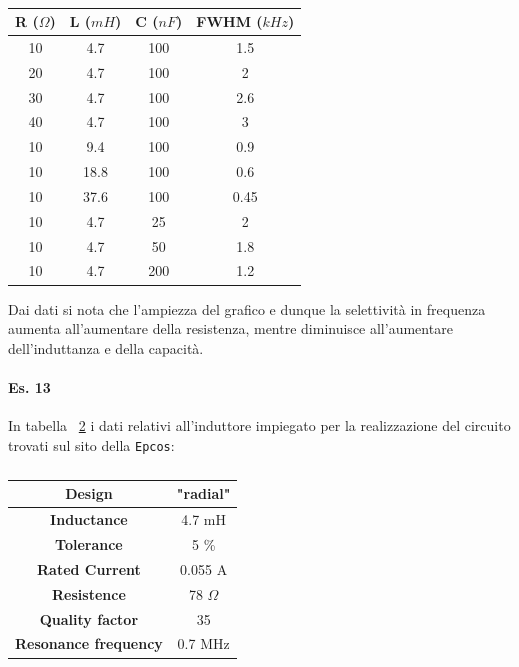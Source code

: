 \documentclass[journal, a4paper]{IEEEtran}
\begin{document}
\begin{table}[htp]
\caption{}
\label{tab:tab1}
\begin{tabular}{c|c|c|c}
\hline 
R ($\Omega$) & L ($mH$) & C ($nF$) & FWHM ($kHz$) \\ 
\hline 
10 & 4.7 & 100 & 1.5 \\ 
\hline 
20 & 4.7 & 100 & 2 \\ 
\hline 
30 & 4.7 & 100 & 2.6 \\ 
\hline 
40 & 4.7 & 100 & 3 \\ 
\hline 
10 & 9.4 & 100 & 0.9 \\ 
\hline 
10 & 18.8 & 100 & 0.6 \\ 
\hline 
10 & 37.6 & 100 & 0.45 \\ 
\hline 
10 & 4.7 & 25 & 2 \\ 
\hline 
10 & 4.7 & 50 & 1.8 \\ 
\hline 
10 & 4.7 & 200 & 1.2 \\
\hline
\end{tabular} 
\centering
\end{table}

Dai dati si nota che l'ampiezza del grafico e dunque la selettività in frequenza aumenta all'aumentare della resistenza, mentre diminuisce all'aumentare dell'induttanza e della capacità.

\paragraph{Es. 13}
In tabella ~\ref{tab:tab2} i dati relativi all'induttore impiegato per la realizzazione del circuito trovati sul sito della \texttt{Epcos}:

\begin{table}[htp]
\caption{}
\label{tab:tab2}
\centering
\begin{tabular}{c|c}
\hline
\textbf{Design} & "radial"\\
\hline
\textbf{Inductance} & 4.7 mH\\
\hline
\textbf{Tolerance} & 5 \% \\
\hline
\textbf{Rated Current} & 0.055 A\\
\hline
\textbf{Resistence} & 78 $\Omega$\\
\hline
\textbf{Quality factor} & 35\\
\hline
\textbf{Resonance frequency} & 0.7 MHz\\
\hline
\end{tabular}
\end{table}
\end{document}
